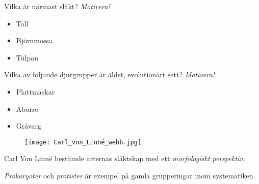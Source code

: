 \documentclass{exam}
\begin{document}
\begin{questions}
\break
\question 
Vilka är närmast släkt? \textit{Motivera!}
\begin{itemize}
  \item Tall
  \item Björnmossa
  \item Tulpan
\end{itemize}
\vspace{30mm}
\question
Vilka av följande djurgrupper är äldst, evolutionärt sett? \textit{Motivera!}
\begin{itemize}
  \item Plattmaskar
  \item Aborre
  \item Gråvarg
\end{itemize}
\vspace{5mm}
\break
\begin{center}
\end{center}
\begin{figure}[h]
    \centering
    \texttt{[image: Carl\_von\_Linné\_webb.jpg]}
\end{figure}
\vspace{5mm} %
\question Carl Von Linné bestämde arternas släktskap med ett \textit{morfologiskt perspektiv}. 
\vspace{60mm}
\question \textit{Prokaryoter} och \textit{protister} är exempel på gamla grupperingar inom systematiken. 


\end{questions}
\end{document}
